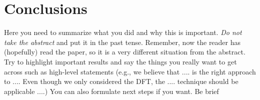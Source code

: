 \section{Conclusions}

Here you need to summarize what you did and why this is
important. {\em Do not take the abstract} and put it in the past
tense. Remember, now the reader has (hopefully) read the paper, so it
is a very different situation from the abstract. Try to highlight
important results and say the things you really want to get across
such as high-level statements (e.g., we believe that .... is the right
approach to .... Even though we only considered the DFT, the
.... technique should be applicable ....) You can also formulate next
steps if you want. Be brief
